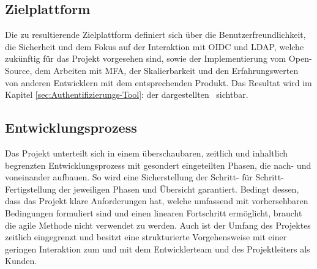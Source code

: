\subsection{Zielplattform}
\label{sec:Zielplattform}
Die zu resultierende Zielplattform definiert sich über die Benutzerfreundlichkeit, die Sicherheit und dem Fokus auf der Interaktion 
mit \acs{OIDC} und \acs{LDAP}, welche zukünftig für das Projekt vorgesehen sind, sowie der Implementierung vom Open-Source, dem Arbeiten mit MFA, 
der Skalierbarkeit und den Erfahrungswerten von anderen Entwicklern mit dem entsprechenden Produkt. Das Resultat wird im Kapitel 
\ref{sec:Authentifizierungs-Tool}:  der dargestellten~ sichtbar.


\subsection{Entwicklungsprozess}
\label{sec:Entwicklungsprozess}
Das Projekt unterteilt sich in einem überschaubaren, zeitlich und inhaltlich begrenzten Entwicklungsprozess 
mit gesondert eingeteilten Phasen, die nach- und voneinander aufbauen. So wird eine Sicherstellung der Schritt- 
für Schritt-Fertigstellung der jeweiligen Phasen und Übersicht garantiert. Bedingt dessen, dass das Projekt klare Anforderungen 
hat, welche umfassend mit vorhersehbaren Bedingungen formuliert sind und einen linearen Fortschritt ermöglicht, braucht 
die agile Methode nicht verwendet zu werden. Auch ist der Umfang des Projektes zeitlich eingegrenzt und besitzt eine 
strukturierte Vorgehensweise mit einer geringen Interaktion zum und mit dem Entwicklerteam und des Projektleiters als Kunden.